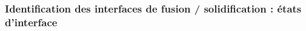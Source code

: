 \documentclass{beamer}
\begin{document}
\begin{frame}
    \frametitle{Identification des interfaces de fusion / solidification : états d'interface}
    \footnotesize
    \begin{columns}[c]
        \begin{column}{0.4\textwidth}
    \begin{center}
		\begin{tikzpicture}[scale = 0.4, every node/.style={scale=0.6}]
        
		\end{tikzpicture}

\end{center}
        \end{column}
\footnotesize
	\begin{column}{0.6\textwidth}
    
    \begin{center}
		\begin{tikzpicture}[scale = 0.5, every node/.style={scale=0.5}]
        
		\end{tikzpicture}

\end{center}
        \end{column}
\normalsize
	\end{columns}

\end{frame}
\end{document}
